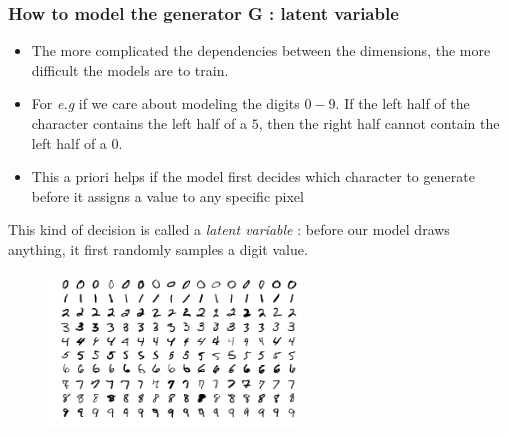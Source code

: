\documentclass[french,9pt]{beamer}
\begin{document}
\begin{frame}
\frametitle{How to model the generator G : latent variable }

\begin{itemize}
\item The more complicated the dependencies between the dimensions, the more difficult the models are to train. 
\pause
\item For \textit{e.g} if we care about modeling the digits $0-9$. If the left half of the character contains the left half of a $5$, then the right half cannot contain the left half of a $0$.
\pause
\item This a priori helps if the model first decides which character to generate before it assigns a value to any specific pixel
\end{itemize}

\pause
This kind of decision is called a \emph{latent variable} : before our model draws anything, it first randomly samples a digit value.

\begin{figure}
  \begin{center}
    \includegraphics[width=0.6\textwidth]{fig/mnist.png}
  \end{center}
\end{figure}

\end{frame}

\end{document}
